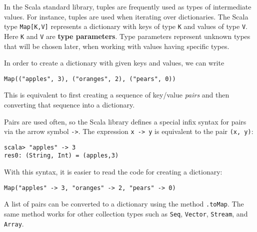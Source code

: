 In the Scala standard library, tuples are frequently used as types
of intermediate values. For instance, tuples are used when iterating
over dictionaries. The Scala type \lstinline!Map[K,V]!
represents a dictionary with keys of type \lstinline!K!
and values of type \lstinline!V!.
Here \lstinline!K! and
\lstinline!V! are \textbf{type
parameters}. Type parameters represent unknown
types that will be chosen later, when working with values having specific
types.

In order to create a dictionary with given keys and values, we can
write
\begin{lstlisting}
Map(("apples", 3), ("oranges", 2), ("pears", 0))
\end{lstlisting}
This is equivalent to first creating a sequence of key/value \emph{pairs}
and then converting that sequence into a dictionary.

Pairs are used often, so the Scala library defines a special infix
syntax for pairs via the arrow symbol \lstinline!->!.
The expression \lstinline!x -> y!
is equivalent to the pair \lstinline!(x, y)!:
\begin{lstlisting}
scala> "apples" -> 3
res0: (String, Int) = (apples,3)
\end{lstlisting}
With this syntax, it is easier to read the code for creating a dictionary:
\begin{lstlisting}
Map("apples" -> 3, "oranges" -> 2, "pears" -> 0)
\end{lstlisting}
A list of pairs can be converted to a dictionary using the method
\lstinline!.toMap!. The
same method works for other collection types such as \lstinline!Seq!,
\lstinline!Vector!, \lstinline!Stream!,
and \lstinline!Array!. 


